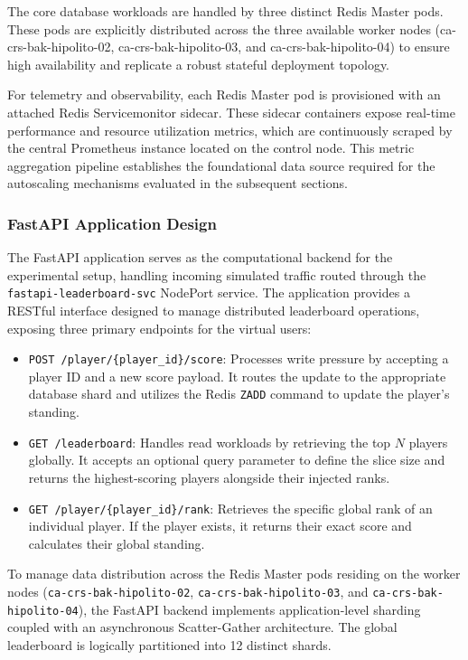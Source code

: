     The core database workloads are handled by three distinct Redis Master pods. These pods are explicitly distributed across the three available worker nodes (ca-crs-bak-hipolito-02, ca-crs-bak-hipolito-03, and ca-crs-bak-hipolito-04) to ensure high availability and replicate a robust stateful deployment topology.
    
    For telemetry and observability, each Redis Master pod is provisioned with an attached Redis Servicemonitor sidecar. These sidecar containers expose real-time performance and resource utilization metrics, which are continuously scraped by the central Prometheus instance located on the control node. This metric aggregation pipeline establishes the foundational data source required for the autoscaling mechanisms evaluated in the subsequent sections.   

\subsubsection{FastAPI Application Design}
\label{subsubsec:fastapi-application-design}

    The FastAPI application serves as the computational backend for the experimental setup, handling incoming simulated traffic routed through the \texttt{fastapi-leaderboard-svc} NodePort service. The application provides a RESTful interface designed to manage distributed leaderboard operations, exposing three primary endpoints for the virtual users:

    \begin{itemize}
        \item \texttt{POST /player/\{player\_id\}/score}: Processes write pressure by accepting a player ID and a new score payload. It routes the update to the appropriate database shard and utilizes the Redis \texttt{ZADD} command to update the player's standing.
        \item \texttt{GET /leaderboard}: Handles read workloads by retrieving the top $N$ players globally. It accepts an optional query parameter to define the slice size and returns the highest-scoring players alongside their injected ranks.
        \item \texttt{GET /player/\{player\_id\}/rank}: Retrieves the specific global rank of an individual player. If the player exists, it returns their exact score and calculates their global standing.
    \end{itemize}

    To manage data distribution across the Redis Master pods residing on the worker nodes (\texttt{ca-crs-bak-hipolito-02}, \texttt{ca-crs-bak-hipolito-03}, and \texttt{ca-crs-bak-hipolito-04}), the FastAPI backend implements application-level sharding coupled with an asynchronous Scatter-Gather architecture. The global leaderboard is logically partitioned into 12 distinct shards.   

